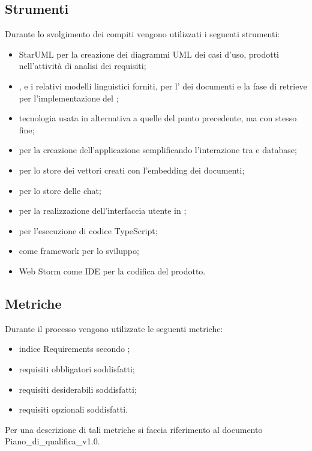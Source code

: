 \subsection{Strumenti}
Durante lo svolgimento dei compiti vengono utilizzati i seguenti strumenti:
\begin{itemize}
    \item StarUML per la creazione dei diagrammi UML dei casi d'uso, prodotti nell'attività di analisi dei requisiti;
    \item {}, e i relativi modelli linguistici forniti, per l' dei documenti e la fase di retrieve per l'implementazione del ;
    \item {} tecnologia usata in alternativa a quelle del punto precedente, ma con stesso fine;
    \item {} per la creazione dell'applicazione semplificando l'interazione tra  e database;
    \item {} per lo store dei vettori creati con l'embedding dei documenti;
    \item {} per lo store delle chat;
    \item {} per la realizzazione dell'interfaccia utente in ;
    \item {} per l'esecuzione di codice TypeScript;
    \item {} come framework per lo sviluppo;
    \item Web Storm come IDE per la codifica del prodotto.
\end{itemize}

\subsection{Metriche}
Durante il processo vengono utilizzate le seguenti metriche:
\begin{itemize}
    \item indice Requirements secondo ;
    \item requisiti obbligatori soddisfatti;
    \item requisiti desiderabili soddisfatti;
    \item requisiti opzionali soddisfatti.
\end{itemize}
Per una descrizione di tali metriche si faccia riferimento al documento Piano\_di\_qualifica\_v1.0.
\newpage



